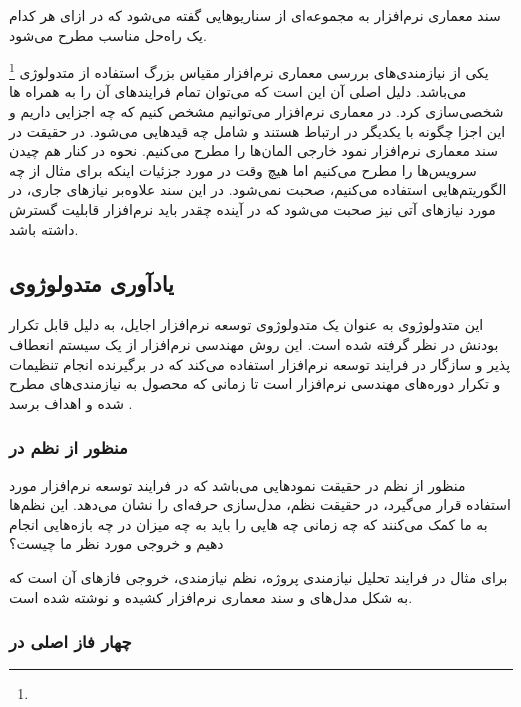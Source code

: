 \documentclass[a4paper]{article}
\begin{document}
سند معماری نرم‌افزار به مجموعه‌ای از سناریو‌هایی گفته می‌شود که در ازای هر کدام
یک راه‌حل مناسب مطرح می‌شود.

یکی از نیازمندی‌های بررسی معماری نرم‌افزار مقیاس بزرگ استفاده از متدولوژی
\footnote{} می‌باشد. دلیل اصلی آن این است
که می‌توان تمام فرایند‌های آن را به همراه ها شخصی‌سازی کرد. در
معماری نرم‌افزار می‌توانیم مشخص کنیم که چه اجزایی داریم و این اجزا چگونه با
یکدیگر در ارتباط هستند و شامل چه قید‌هایی می‌شود. در حقیقت در سند معماری
نرم‌افزار نمود خارجی المان‌ها را مطرح می‌کنیم. نحوه در کنار هم چیدن سرویس‌ها را
مطرح می‌کنیم اما هیچ وقت در مورد جزئیات اینکه برای مثال از چه الگوریتم‌هایی
استفاده می‌کنیم، صحبت نمی‌شود. در این سند علاوه‌بر نیاز‌های جاری، در مورد
نیاز‌های آتی نیز صحبت می‌شود که در آینده چقدر باید نرم‌افزار قابلیت گسترش
 داشته باشد.

\subsection{یادآوری متدولوژوی }

این متدولوژوی به عنوان یک متدولوژوی توسعه نرم‌افزار اجایل، به دلیل قابل تکرار
بودنش در نظر گرفته شده است. این روش مهندسی نرم‌افزار از یک سیستم انعطاف پذیر و
سازگار در فرایند توسعه نرم‌افزار استفاده می‌کند که در برگیرنده انجام تنظیمات و
تکرار دوره‌های مهندسی نرم‌افزار است تا زمانی که محصول به نیازمندی‌های مطرح شده و
اهداف برسد \cite{rupStudy}.

\subsubsection{منظور از نظم در }

منظور از نظم در حقیقت نمود‌هایی می‌باشد که در فرایند توسعه نرم‌افزار مورد
استفاده قرار می‌گیرد، در حقیقت نظم، مدل‌سازی حرفه‌ای را نشان می‌دهد. این نظم‌ها
به ما کمک می‌کنند که چه زمانی چه هایی را باید به چه میزان در چه
بازه‌هایی انجام دهیم و خروجی مورد نظر ما چیست؟

برای مثال در فرایند تحلیل نیازمندی پروژه، نظم نیازمندی، خروجی فاز‌های آن است که
به شکل مدل‌های  و سند معماری نرم‌افزار کشیده و نوشته شده
است.

\subsubsection{چهار فاز اصلی در }
\end{document}
